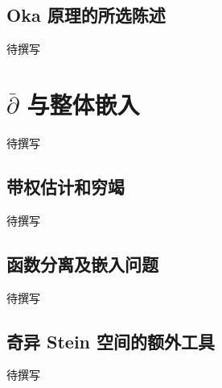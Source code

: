\subsection{Oka 原理的所选陈述}
\label{g4:subsec:A02:03}
待撰写

\section{\texorpdfstring{\(\bar{\partial}\) 与整体嵌入}{\={∂} 与整体嵌入}}
\label{g4:sec:A03}
待撰写

\subsection{带权估计和穷竭}
\label{g4:subsec:A03:01}
待撰写

\subsection{函数分离及嵌入问题}
\label{g4:subsec:A03:02}
待撰写

\subsection{奇异 Stein 空间的额外工具}
\label{g4:subsec:A03:03}
待撰写
